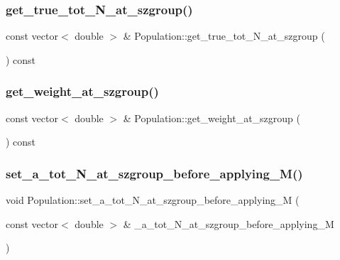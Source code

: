\mbox{\label{class_population_aaa50918cd90d97e8e9bfadb7f216a218}} 
\subsubsection{\texorpdfstring{get\_true\_tot\_N\_at\_szgroup()}{get\_true\_tot\_N\_at\_szgroup()}}
{\footnotesize\ttfamily const vector$<$ double $>$ \& Population\+::get\+\_\+true\+\_\+tot\+\_\+\+N\+\_\+at\+\_\+szgroup (\begin{DoxyParamCaption}{ }\end{DoxyParamCaption}) const}

\mbox{\label{class_population_a4ac1d18b27bc6a29bc1bf9b39bd150dc}} 
\subsubsection{\texorpdfstring{get\_weight\_at\_szgroup()}{get\_weight\_at\_szgroup()}}
{\footnotesize\ttfamily const vector$<$ double $>$ \& Population\+::get\+\_\+weight\+\_\+at\+\_\+szgroup (\begin{DoxyParamCaption}{ }\end{DoxyParamCaption}) const}

\mbox{\label{class_population_add02af66e78668224dfbacc8a4ddf704}} 
\subsubsection{\texorpdfstring{set\_a\_tot\_N\_at\_szgroup\_before\_applying\_M()}{set\_a\_tot\_N\_at\_szgroup\_before\_applying\_M()}}
{\footnotesize\ttfamily void Population\+::set\+\_\+a\+\_\+tot\+\_\+\+N\+\_\+at\+\_\+szgroup\+\_\+before\+\_\+applying\+\_\+M (\begin{DoxyParamCaption}\item[{const vector$<$ double $>$ \&}]{\+\_\+a\+\_\+tot\+\_\+\+N\+\_\+at\+\_\+szgroup\+\_\+before\+\_\+applying\+\_\+M }\end{DoxyParamCaption})}

